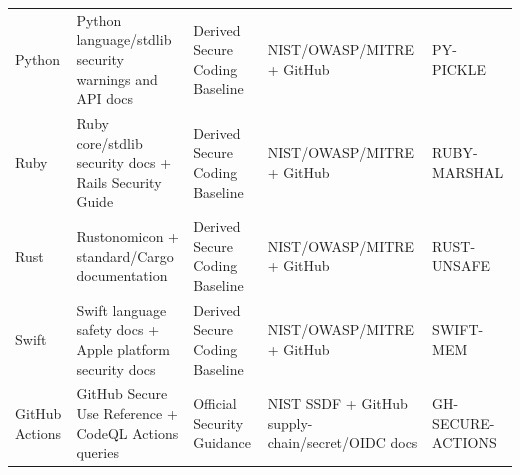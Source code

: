 \documentclass[10pt,letterpaper]{article}
\begin{document}
\begin{landscape}
\begin{longtable}{@{}P{0.8in}P{2.05in}P{1.45in}P{3.25in}P{0.7in}@{}}
Python & Python language/stdlib security warnings and API docs & Derived Secure Coding Baseline & NIST/OWASP/MITRE + GitHub & PY-PICKLE\\
Ruby & Ruby core/stdlib security docs + Rails Security Guide & Derived Secure Coding Baseline & NIST/OWASP/MITRE + GitHub & RUBY-MARSHAL\\
Rust & Rustonomicon + standard/Cargo documentation & Derived Secure Coding Baseline & NIST/OWASP/MITRE + GitHub & RUST-UNSAFE\\
Swift & Swift language safety docs + Apple platform security docs & Derived Secure Coding Baseline & NIST/OWASP/MITRE + GitHub & SWIFT-MEM\\
GitHub Actions & GitHub Secure Use Reference + CodeQL Actions queries & Official Security Guidance & NIST SSDF + GitHub supply-chain/secret/OIDC docs & GH-SECURE-ACTIONS\\
\bottomrule
\end{longtable}
\end{landscape}
\end{document}
